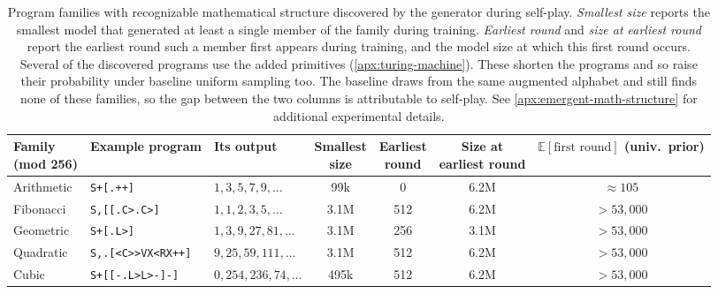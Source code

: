 
\begin{table}[ht]
\centering
\footnotesize
\setlength{\tabcolsep}{4pt}
\begin{tabular}{lllcccc}
\toprule
\makecell{\textbf{Family}\\\textbf{(mod 256)}} &
\textbf{Example program} & 
\textbf{Its output} &
\makecell{\textbf{Smallest}\\\textbf{size}} &
\makecell{\textbf{Earliest}\\\textbf{round}} &
\makecell{\textbf{Size at}\\\textbf{earliest round}} &
\makecell{$\mathbb{E}[\text{first round}]$\\\textbf{(univ.\ prior)}} \\
\midrule
Arithmetic & \texttt{S+[.++]}            & $1,3,5,7,9,\ldots$   & 99k  & 0 & 6.2M & $\approx 105$ \\
Fibonacci  & \texttt{S,[[.C>.C>]}        & $1,1,2,3,5,\ldots$   & 3.1M & 512 & 6.2M & $>53{,}000$ \\
Geometric  & \texttt{S+[.L>]}            & $1,3,9,27,81,\ldots$ & 3.1M & 256 & 3.1M & $>53{,}000$ \\
Quadratic  & \texttt{S,.[<C>{}>VX<RX++]}   & $9,25,59,111,\ldots$ & 3.1M & 512 & 6.2M & $>53{,}000$ \\
Cubic      & \texttt{S+[[-.L>L>-]-]}     & $0,254,236,74,\ldots$ & 495k & 512 & 6.2M & $>53{,}000$ \\
\bottomrule
\end{tabular}
\vspace{6pt}
\caption{Program families with recognizable mathematical structure discovered by the generator during self-play.  
\emph{Smallest size} reports the smallest model that generated at least a single member of the family during training. 
\emph{Earliest round} and \emph{size at earliest round} report the earliest round such a member first appears during training, and the model size at which this first round occurs.
Several of the discovered programs use the added primitives (\cref{apx:turing-machine}).
These shorten the programs and so raise their probability under baseline uniform sampling too.
The baseline draws from the same augmented alphabet and still finds none of these
families, so the gap between the two columns is attributable to self-play. See \cref{apx:emergent-math-structure} for additional experimental details.}
\label{tab: discovered-math-structure}
\end{table}

